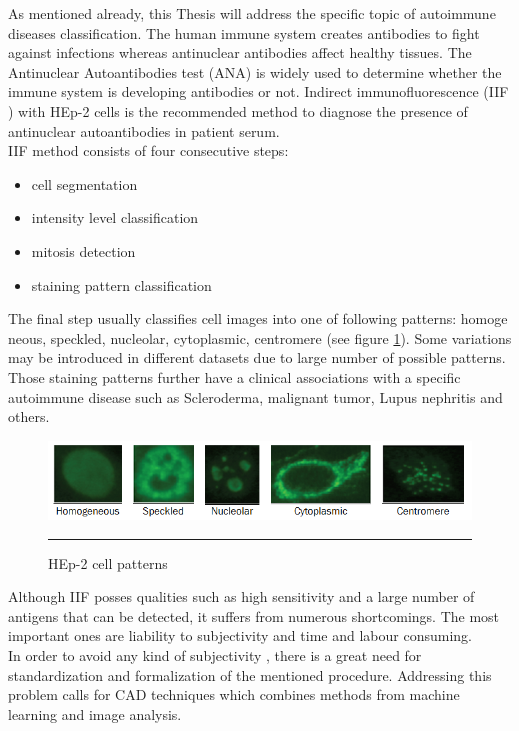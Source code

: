 As mentioned already, this Thesis will address the specific topic of autoimmune diseases classification. The human immune system creates antibodies to fight against infections whereas antinuclear antibodies affect healthy tissues. The Antinuclear Autoantibodies test (ANA) is widely used to determine whether the immune system is developing antibodies or not. Indirect immunofluorescence (IIF ) with HEp-2 cells is the recommended method to diagnose the presence of antinuclear autoantibodies in patient serum. \\

IIF method consists of four consecutive steps:
\begin{itemize}
	\item cell segmentation
 	\item intensity level classification
 	\item mitosis detection
 	\item staining pattern classification
\end{itemize}

The final step usually classifies cell images into one of following patterns: homoge
neous, speckled, nucleolar, cytoplasmic, centromere (see figure \ref{fig:CellExamples}). Some variations may be introduced in different datasets due to large number of possible patterns. Those staining patterns further have a clinical associations with a specific autoimmune disease such as Scleroderma, malignant tumor, Lupus nephritis and others. \\

\begin{figure}[htbp]
	\centering
	\includegraphics[scale=0.7]{Figures/introduction/cell_examples}
	\rule{35em}{0.5pt}
	\caption[Cell examples]{HEp-2 cell patterns}
	\label{fig:CellExamples}

\end{figure}

Although IIF posses qualities such as high sensitivity and a large number of antigens
that can be detected, it suffers from numerous shortcomings. The most important ones
are liability to subjectivity and time and labour consuming. \\

In order to avoid any kind of subjectivity , there is a great need for standardization and formalization of the mentioned procedure. Addressing this problem calls for CAD techniques which combines methods from machine learning and image analysis.

